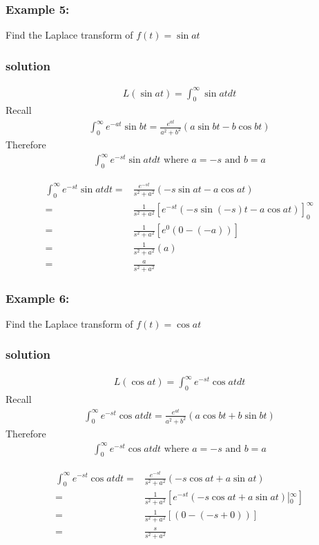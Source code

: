 \documentclass[12pt]{report}
\begin{document}
\subsubsection{Example 5:}
Find the Laplace transform of $f(t)=\sin at$
\subsubsection{solution}
\begin{align*}
L(\sin at)= \int_0^\infty \sin at dt
\end{align*}
Recall
\begin{align*}
\int_0^\infty e^{-at} \sin bt = \frac{e^{at}}{a^2+b^2}(a \sin bt - b\cos bt)
\end{align*}
Therefore
\begin{align*}
\int_0^\infty e^{-st}\sin at dt \mbox{ where } a=-s \mbox{ and } b=a
\end{align*}

\begin{align*}
\int_0^\infty e^{-st}\sin at dt = & \frac{e^{-st}}{s^2+a^2}(-s\sin at-a \cos at) \\
=& \frac{1}{s^2+a^2} \left[ e^{-st}(-s\sin (-s)t-a \cos at)\right]_0^\infty \\
=& \frac{1}{s^2+a^2} \left[ e^0(0-(-a))\right ]  \\
=& \frac{1}{s^2+a^2}(a) \\
=& \frac{a}{s^2+a^2}
\end{align*}
\subsubsection{Example 6:}
Find the Laplace transform of $f(t)=\cos at$
\subsubsection{solution}
\begin{align*}
L(\cos at)= \int_0^\infty e^{-st}\cos at dt
\end{align*}
Recall
\begin{align*}
\int_0^\infty e^{-st} \cos at dt = \frac{e^{at}}{a^2+b^2}(a \cos bt+b\sin bt)
\end{align*}
Therefore
\begin{align*}
\int_0^\infty e^{-st}\cos at dt \mbox{ where } a=-s \mbox{ and } b=a
\end{align*}

\begin{align*}
\int_0^\infty e^{-st}\cos at dt = & \frac{e^{-st}}{s^2+a^2}(-s\cos at+a \sin at) \\
=& \frac{1}{s^2+a^2} \left[ e^{-st}(-s\cos at+a \sin at) \left|_0^\infty \right. \right] \\
=& \frac{1}{s^2+a^2} \left[(0-(-s+0))\right ]  \\
=& \frac{s}{s^2+a^2}
\end{align*}
\end{document}
